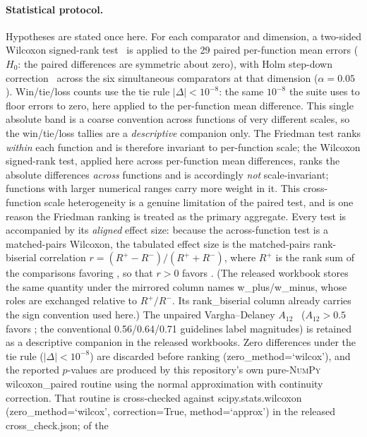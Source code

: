 \paragraph{Statistical protocol.}
Hypotheses are stated once here. For each comparator and dimension,
a two-sided Wilcoxon signed-rank test~\cite{wilcoxon1945individual}
is applied to the 29 paired per-function mean errors
($H_{0}$: the paired differences are symmetric about zero), with
Holm step-down correction~\cite{holm1979simple} across the
six simultaneous comparators at that dimension ($\alpha = 0.05$).
Win/tie/loss counts use the tie rule $|\Delta| < 10^{-8}$: the same
$10^{-8}$ the suite uses to floor errors to zero, here applied to the
per-function mean difference. This single absolute band is a coarse
convention across functions of very different scales, so the win/tie/loss
tallies are a \emph{descriptive} companion only. The Friedman test ranks
\emph{within} each function and is therefore invariant to per-function scale;
the Wilcoxon signed-rank test, applied here across per-function mean
differences, ranks the absolute differences \emph{across} functions and is
accordingly \emph{not} scale-invariant; functions with larger numerical
ranges carry more weight in it. This cross-function scale heterogeneity is a
genuine limitation
of the paired test, and is one reason the Friedman ranking is treated as the
primary aggregate. Every
test is accompanied by its \emph{aligned} effect size: because the
across-function test is a matched-pairs Wilcoxon, the tabulated effect size is
the matched-pairs rank-biserial correlation
$r = (R^{+} - R^{-})/(R^{+} + R^{-})$, where $R^{+}$ is the rank sum of the
comparisons favoring \dtgsk{}, so that $r > 0$ favors \dtgsk{}. (The released
workbook stores the same quantity under the mirrored column names
w\_plus/w\_minus, whose roles are exchanged relative to
$R^{+}/R^{-}$. Its rank\_biserial column already carries the sign
convention used here.) The
unpaired Vargha--Delaney $A_{12}$~\cite{vargha2000critique} ($A_{12} > 0.5$
favors \dtgsk{}; the conventional 0.56/0.64/0.71 guidelines label magnitudes)
is retained as a descriptive companion in the released workbooks. Zero differences under the tie rule
($|\Delta| < 10^{-8}$) are discarded before ranking
(zero\_method=`wilcox'), and the reported $p$-values are produced by
this repository's own pure-\textsc{NumPy} wilcoxon\_paired routine
using the normal approximation with continuity correction. That routine is
cross-checked against scipy.stats.wilcoxon
(zero\_method=`wilcox', correction=True,
method=`approx') in the released cross\_check.json; of the
